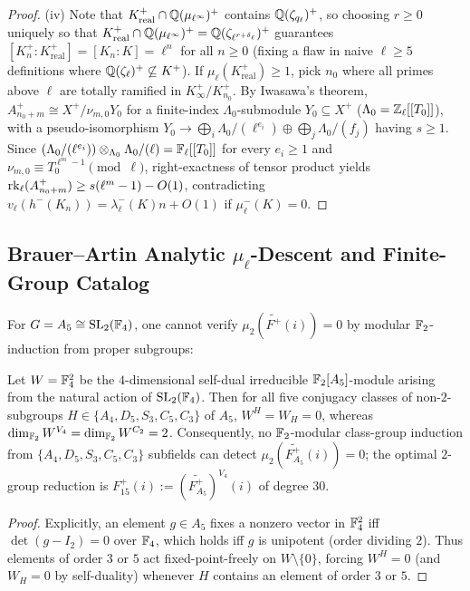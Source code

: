 \begin{proof}
(iv) Note that $K_{\mathrm{real}}^+ \cap \mathbb{Q}(\mu_{\ell^\infty})^+$ contains $\mathbb{Q}(\zeta_{q_\ell})^+$, so choosing $r \ge 0$ uniquely so that $K_{\mathrm{real}}^+ \cap \mathbb{Q}(\mu_{\ell^\infty})^+ = \mathbb{Q}(\zeta_{\ell^{r+\delta_\ell}})^+$ guarantees $[K_n^+ : K_{\mathrm{real}}^+] = [K_n : K] = \ell^n$ for all $n \ge 0$ (fixing a flaw in naive $\ell \ge 5$ definitions where $\mathbb{Q}(\zeta_\ell)^+ \not\subseteq K^+$). If $\mu_\ell(K_{\mathrm{real}}^+) \ge 1$, pick $n_0$ where all primes above $\ell$ are totally ramified in $K_\infty^+/K_{n_0}^+$. By Iwasawa's theorem, $A_{n_0+m}^+ \cong X^+/ \nu_{m,0} Y_0$ for a finite-index $\Lambda_0$-submodule $Y_0 \subseteq X^+$ ($\Lambda_0 = \mathbb{Z}_\ell[[T_0]]$), with a pseudo-isomorphism $Y_0 \to \bigoplus_i \Lambda_0/(\ell^{e_i}) \oplus \bigoplus_j \Lambda_0/(f_j)$ having $s \ge 1$. Since $(\Lambda_0/(\ell^{e_i})) \otimes_{\Lambda_0} \Lambda_0/(\ell) = \mathbb{F}_\ell[[T_0]]$ for every $e_i \ge 1$ and $\nu_{m,0} \equiv T_0^{\ell^m-1} \pmod{\ell}$, right-exactness of tensor product yields $\operatorname{rk}_\ell(A_{n_0+m}^+) \ge s(\ell^m - 1) - O(1)$, contradicting $v_\ell(h^-(K_n)) = \lambda_\ell^-(K) n + O(1)$ if $\mu_\ell^-(K) = 0$.
\end{proof}

\subsection{Brauer--Artin Analytic $\mu_\ell$-Descent and Finite-Group Catalog}\label{sec:3:descent}

For $G = A_5 \cong \mathrm{SL}_2(\mathbb{F}_4)$, one cannot verify $\mu_2(\widetilde{F^+}(i)) = 0$ by modular $\mathbb{F}_2$-induction from proper subgroups:

\begin{proposition}\label{prop:3:a5obs}
\tagObs{}
Let $W = \mathbb{F}_4^2$ be the $4$-dimensional self-dual irreducible $\mathbb{F}_2[A_5]$-module arising from the natural action of $\mathrm{SL}_2(\mathbb{F}_4)$. Then for all five conjugacy classes of non-$2$-subgroups $H \in \{A_4, D_5, S_3, C_5, C_3\}$ of $A_5$, $W^H = W_H = 0$, whereas $\dim_{\mathbb{F}_2} W^{V_4} = \dim_{\mathbb{F}_2} W^{C_2} = 2$. Consequently, no $\mathbb{F}_2$-modular class-group induction from $\{A_4, D_5, S_3, C_5, C_3\}$ subfields can detect $\mu_2(\widetilde{F_{A_5}^+}(i)) = 0$; the optimal $2$-group reduction is $F_{15}^+(i) := (\widetilde{F_{A_5}^+})^{V_4}(i)$ of degree $30$.
\end{proposition}
\begin{proof}
Explicitly, an element $g \in A_5$ fixes a nonzero vector in $\mathbb{F}_4^2$ iff $\det(g - I_2) = 0$ over $\mathbb{F}_4$, which holds iff $g$ is unipotent (order dividing $2$). Thus elements of order $3$ or $5$ act fixed-point-freely on $W \setminus \{0\}$, forcing $W^H = 0$ (and $W_H = 0$ by self-duality) whenever $H$ contains an element of order $3$ or $5$.
\end{proof}

